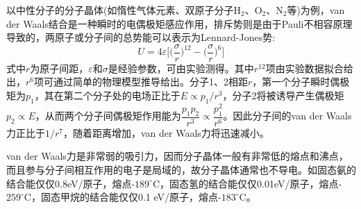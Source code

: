 以中性分子的分子晶体(如惰性气体元素、双原子分子$\mathrm{H}_2$、$\mathrm{O}_2$、$\mathrm{N}_2$等)为例，van der Waals结合是一种瞬时的电偶极矩感应作用，排斥势则是由于Pauli不相容原理导致的，两原子或分子间的总势能可以表示为Lennard-Jones势:
\begin{equation}
	U=4\varepsilon\bigg[\big(\dfrac{\sigma}r\big)^{12}-\big(\dfrac{\sigma}r\big)^6\bigg]
	\label{eq:SSI-04}
\end{equation}
式中$r$为原子间距，$\varepsilon$和$\sigma$是经验参数，可由实验测得。其中$r^{12}$项由实验数据拟合给出，$r^6$项可通过简单的物理模型推导给出。分子1、2相距$r$，第一个分子瞬时偶极矩为$p_1$，其在第二个分子处的电场正比于$E\propto p_1/r^3$，分子2将被诱导产生偶极矩$p_2\propto E$，从而两个分子间偶极矩作用能为$\dfrac{p_1p_2}{r^3}\propto\dfrac{p_1^2}{r^6}$。因此分子间的van der Waals力正比于$1/r^7$，随着距离增加，van der Waals力将迅速减小。

van der Waals力是非常弱的吸引力，因而分子晶体一般有非常低的熔点和沸点，而且参与分子间相互作用的电子是局域的，故分子晶体通常也不导电。如固态氨的结合能仅仅0.8eV/原子，熔点-$189^{\circ}\mathrm{C}$，固态氢的结合能仅仅0.01eV/原子，熔点-$259^{\circ}\mathrm{C}$，固态甲烷的结合能仅仅0.1 eV/原子，熔点-$183^{\circ}\mathrm{C}$。

